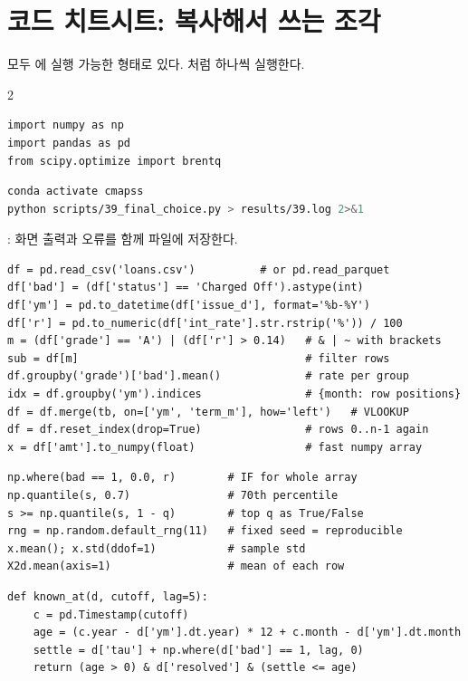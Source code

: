\chapter{코드 치트시트: 복사해서 쓰는 조각}
모두 에 실행 가능한 형태로 있다. 처럼 하나씩 실행한다.
\begingroup{}\setlength{\columnsep}{6mm}\lstset{basicstyle=\ttfamily\scriptsize,numbers=none,aboveskip=3pt,belowskip=3pt}

\begin{multicols}{2}\raggedright\small

\begin{lstlisting}
import numpy as np
import pandas as pd
from scipy.optimize import brentq
\end{lstlisting}
\begin{lstlisting}[language=bash]
conda activate cmapss
python scripts/39_final_choice.py > results/39.log 2>&1
\end{lstlisting}
: 화면 출력과 오류를 함께 파일에 저장한다.

\begin{lstlisting}
df = pd.read_csv('loans.csv')          # or pd.read_parquet
df['bad'] = (df['status'] == 'Charged Off').astype(int)
df['ym'] = pd.to_datetime(df['issue_d'], format='%b-%Y')
df['r'] = pd.to_numeric(df['int_rate'].str.rstrip('%')) / 100
m = (df['grade'] == 'A') | (df['r'] > 0.14)   # & | ~ with brackets
sub = df[m]                                   # filter rows
df.groupby('grade')['bad'].mean()             # rate per group
idx = df.groupby('ym').indices                # {month: row positions}
df = df.merge(tb, on=['ym', 'term_m'], how='left')   # VLOOKUP
df = df.reset_index(drop=True)                # rows 0..n-1 again
x = df['amt'].to_numpy(float)                 # fast numpy array
\end{lstlisting}

\begin{lstlisting}
np.where(bad == 1, 0.0, r)        # IF for whole array
np.quantile(s, 0.7)               # 70th percentile
s >= np.quantile(s, 1 - q)        # top q as True/False
rng = np.random.default_rng(11)   # fixed seed = reproducible
x.mean(); x.std(ddof=1)           # sample std
X2d.mean(axis=1)                  # mean of each row
\end{lstlisting}

\begin{lstlisting}
def known_at(d, cutoff, lag=5):
    c = pd.Timestamp(cutoff)
    age = (c.year - d['ym'].dt.year) * 12 + c.month - d['ym'].dt.month
    settle = d['tau'] + np.where(d['bad'] == 1, lag, 0)
    return (age > 0) & d['resolved'] & (settle <= age)


\end{lstlisting}
\end{multicols}
